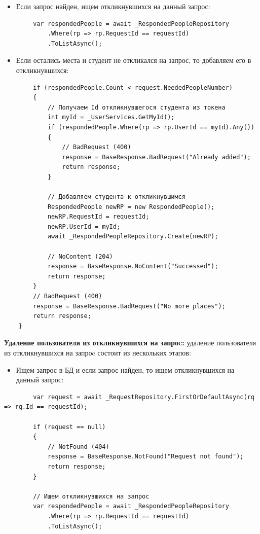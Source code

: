 \begin{itemize}
	\item{Если запрос найден, ищем откликнувшихся на данный запрос:}
\end{itemize}
\begin{verbatim}
        var respondedPeople = await _RespondedPeopleRepository
            .Where(rp => rp.RequestId == requestId)
            .ToListAsync();
\end{verbatim}

\begin{itemize}
	\item{Если остались места и студент не откликался на запрос, то добавляем его в откликнувшихся:}
\end{itemize}
\begin{verbatim}
        if (respondedPeople.Count < request.NeededPeopleNumber)
        {
            // Получаем Id откликнувшегося студента из токена
            int myId = _UserServices.GetMyId();
            if (respondedPeople.Where(rp => rp.UserId == myId).Any())
            {
                // BadRequest (400)
                response = BaseResponse.BadRequest("Already added");
                return response;
            }

            // Добавляем студента к откликнувшимся
            RespondedPeople newRP = new RespondedPeople();
            newRP.RequestId = requestId;
            newRP.UserId = myId;
            await _RespondedPeopleRepository.Create(newRP);

            // NoContent (204)
            response = BaseResponse.NoContent("Successed");
            return response;
        }
        // BadRequest (400)
        response = BaseResponse.BadRequest("No more places");
        return response;
    }
\end{verbatim}


\textbf{Удаление пользователя из откликнувшихся на запроc:} удаление пользователя из откликнувшихся на запроc состоит из нескольких этапов:
\begin{itemize}
	\item{Ищем запрос в БД и если запрос найден, то ищем откликнувшихся на данный запрос:}
\end{itemize}
\begin{verbatim}
        var request = await _RequestRepository.FirstOrDefaultAsync(rq => rq.Id == requestId);

        if (request == null)
        {
            // NotFound (404)
            response = BaseResponse.NotFound("Request not found");
            return response;
        }

        // Ищем откликнувшихся на запрос
        var respondedPeople = await _RespondedPeopleRepository
            .Where(rp => rp.RequestId == requestId)
            .ToListAsync();

\end{verbatim}

